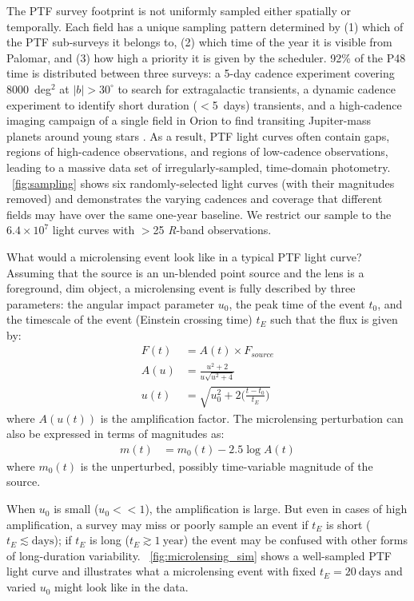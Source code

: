 \documentclass[iop]{emulateapj}
\newcommand{\apwsim}{\raisebox{0.2ex}{\scriptsize$\sim$\normalsize}}
\begin{document}
The PTF survey footprint is not uniformly sampled either spatially or temporally. Each field has a unique sampling pattern determined by (1) which of the PTF sub-surveys it belongs to, (2) which time of the year it is visible from Palomar, and (3) how high a priority it is given by the scheduler. 92\% of the P48 time is distributed between three  surveys: a 5-day cadence experiment covering 8000~deg$^2$ at $|b|>30^\circ$ to search for extragalactic transients, a dynamic cadence experiment to identify short duration ($<$5~days) transients, and a high-cadence imaging campaign of a single field in Orion to find transiting Jupiter-mass planets around young stars \citep{nick2009}. As a result, PTF light curves often contain gaps, regions of high-cadence observations, and regions of low-cadence observations, leading to a massive data set of irregularly-sampled, time-domain photometry. \figurename~\ref{fig:sampling} shows six randomly-selected light curves (with their magnitudes removed) and demonstrates the varying cadences and coverage that different fields may have over the same one-year baseline. We restrict our sample to the \apwsim$6.4\times10^7$ light curves with $>$25 \textit{R}-band observations.

What would a microlensing event look like in a typical PTF light curve? Assuming that the source is an un-blended point source and the lens is a foreground, dim object, a microlensing event is fully described by three parameters: the angular impact parameter $u_0$, the peak time of the event $t_0$, and the timescale of the event (Einstein crossing time) $t_E$ such that the flux is given by:
\begin{align}
	F(t) &= A(t)\times F_{source} \\
	A(u) &= \frac{u^2 + 2}{u\sqrt{u^2 + 4}}\\
	u(t) &= \sqrt{u_0^2 + 2\Big(\frac{t-t_0}{t_E}\Big)}
\end{align}
where $A(u(t))$ is the amplification factor. The microlensing perturbation can also be expressed in terms of magnitudes as:
\begin{align}
	m(t) &= m_0(t) - 2.5\log A(t)
\end{align}
where $m_0(t)$ is the unperturbed, possibly time-variable magnitude of the source.

When $u_0$ is small ($u_0<<1$), the amplification is large. But even in cases of high amplification, a survey may miss or poorly sample an event if $t_E$ is short ($t_E \lesssim\mathrm{days}$); if $t_E$ is long ($t_E \gtrsim 1~\mathrm{year}$) the event may be confused with other forms of long-duration variability. \figurename~\ref{fig:microlensing_sim} shows a well-sampled PTF light curve and illustrates what a microlensing event with fixed $t_E=20~\mathrm{days}$ and varied $u_0$ might look like in the data.
\end{document}
